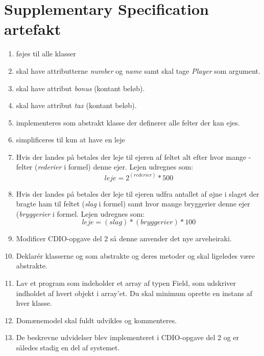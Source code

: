 \chapter{Supplementary Specification artefakt}\label{chap:suppSpec}

\begin{enumerate}
\item {} føjes til alle klasser
\item {} skal have attributterne \textit{number} og \textit{name} samt  skal tage \textit{Player} som argument.
\item {} skal have attribut \textit{bonus} (kontant beløb).
\item {} skal have attribut \textit{tax} (kontant beløb).
\item {} implementeres som abstrakt klasse der definerer alle felter der kan ejes. 
\item {} simplificeres til kun at have en leje 
\item Hvis der landes på  betales der leje til ejeren af feltet alt efter hvor mange -felter (\textit{rederier} i formel) denne ejer. Lejen udregnes som: $$leje=2^{(rederier)}*500$$
\item Hvis der landes på  betales der leje til ejeren udfra antallet af øjne i slaget der bragte ham til feltet (\textit{slag} i formel) samt hvor mange bryggerier denne ejer (\textit{bryggerier} i formel. Lejen udregnes som: $$leje=(slag)*(bryggerier)*100$$
\item Modificer CDIO-opgave del 2 så denne anvender det nye arveheiraki.
\item Deklarér klasserne  og  som abstrakte og deres metoder  og  skal ligeledes være abstrakte.
\item Lav et program  som indeholder et array af typen Field, som udskriver indholdet af hvert objekt i array’et. Du skal minimum oprette en instans af hver klasse.
\item Domænemodel skal fuldt udvikles og kommenteres.  
\item De beskrevne udvidelser blev implementeret i CDIO-opgave del 2 og er således stadig en del af systemet. 
\end{enumerate}